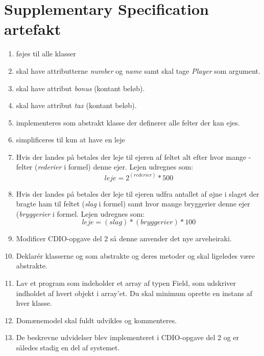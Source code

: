 \chapter{Supplementary Specification artefakt}\label{chap:suppSpec}

\begin{enumerate}
\item {} føjes til alle klasser
\item {} skal have attributterne \textit{number} og \textit{name} samt  skal tage \textit{Player} som argument.
\item {} skal have attribut \textit{bonus} (kontant beløb).
\item {} skal have attribut \textit{tax} (kontant beløb).
\item {} implementeres som abstrakt klasse der definerer alle felter der kan ejes. 
\item {} simplificeres til kun at have en leje 
\item Hvis der landes på  betales der leje til ejeren af feltet alt efter hvor mange -felter (\textit{rederier} i formel) denne ejer. Lejen udregnes som: $$leje=2^{(rederier)}*500$$
\item Hvis der landes på  betales der leje til ejeren udfra antallet af øjne i slaget der bragte ham til feltet (\textit{slag} i formel) samt hvor mange bryggerier denne ejer (\textit{bryggerier} i formel. Lejen udregnes som: $$leje=(slag)*(bryggerier)*100$$
\item Modificer CDIO-opgave del 2 så denne anvender det nye arveheiraki.
\item Deklarér klasserne  og  som abstrakte og deres metoder  og  skal ligeledes være abstrakte.
\item Lav et program  som indeholder et array af typen Field, som udskriver indholdet af hvert objekt i array’et. Du skal minimum oprette en instans af hver klasse.
\item Domænemodel skal fuldt udvikles og kommenteres.  
\item De beskrevne udvidelser blev implementeret i CDIO-opgave del 2 og er således stadig en del af systemet. 
\end{enumerate}